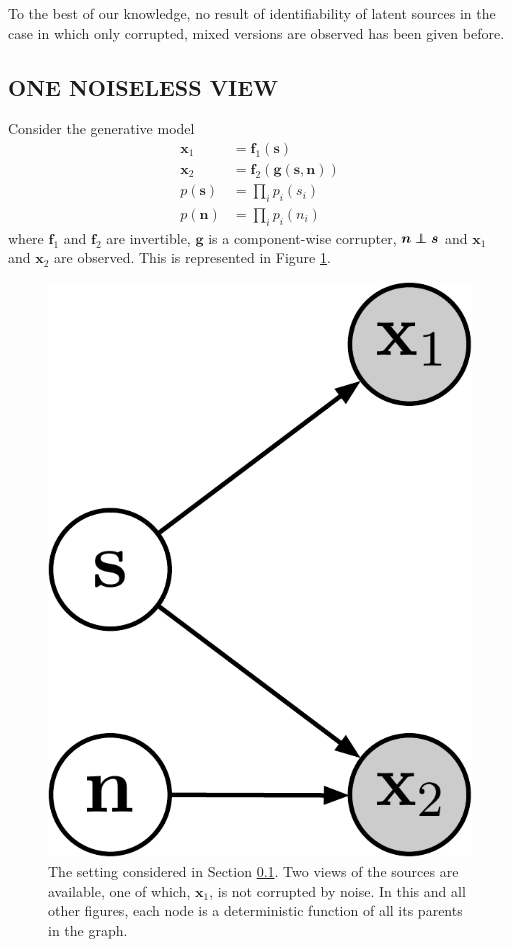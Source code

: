 \documentclass[letterpaper]{article}
\newcommand\independent{\protect\mathpalette{\protect\independenT}{\perp}}
\def\independenT#1#2{\mathrel{\rlap{$#1#2$}\mkern2mu{#1#2}}}
\theoremstyle{definition}
\begin{document}
To the best of our knowledge, no result of identifiability of latent sources in the case in which only corrupted, mixed versions are observed has been given before.



\subsection{ONE NOISELESS VIEW}
\label{sec:onenoisless}
Consider the generative model
\begin{align}
\bm{x}_{1}&=\bm{f}_{1}(\bm{s}) \label{eq:sem2_1}\\
\bm{x}_{2}&=\bm{f}_{2}(\bm{g}(\bm{s}, \bm{n})) \label{eq:sem2_2} \\
p(\bm{s}) &= \prod_{i} p_i(s_i) \nonumber \\
p(\bm{n}) &= \prod_{i} p_i(n_i) \label{eq:indep}
\end{align}
where $\bm{f}_1$ and $\bm{f}_2$ are invertible, $\bm{g}$ is a component-wise corrupter, $\bm{n} \independent \bm{s}$ and $\bm{x}_1$ and $\bm{x}_2$ are observed.
This is represented in Figure \ref{fig:generalized_hsr_basic}.



\begin{figure}[t!]
    \centering
    \includegraphics[scale=0.3]{img_pdf/one_noisy.pdf}
    \caption{The setting considered in Section \ref{sec:onenoisless}. Two views of the sources are available, one of which, $\bm{x}_1$, is not corrupted by noise. In this and all other figures, each node is a deterministic function of all its parents in the graph.
        }
    \label{fig:generalized_hsr_basic}
\end{figure}
\end{document}
